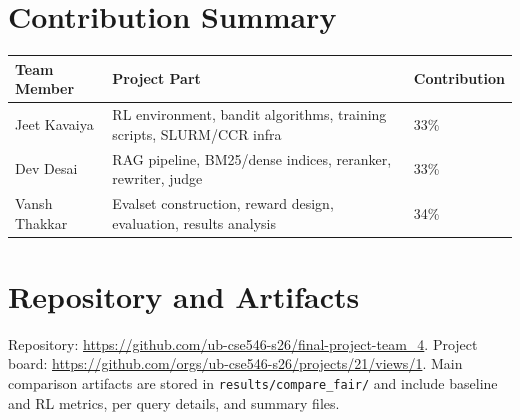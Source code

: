 \documentclass{article}
\begin{document}
\section*{Contribution Summary}

\begin{table}[h]
\centering
\small
\begin{tabular}{lll}
\toprule
Team Member & Project Part & Contribution \\
\midrule
Jeet Kavaiya  & RL environment, bandit algorithms, training scripts, SLURM/CCR infra & 33\% \\
Dev Desai     & RAG pipeline, BM25/dense indices, reranker, rewriter, judge          & 33\% \\
Vansh Thakkar & Evalset construction, reward design, evaluation, results analysis    & 34\% \\
\bottomrule
\end{tabular}
\end{table}

\section*{Repository and Artifacts}

Repository: \url{https://github.com/ub-cse546-s26/final-project-team_4}.  
Project board: \url{https://github.com/orgs/ub-cse546-s26/projects/21/views/1}.  
Main comparison artifacts are stored in \texttt{results/compare\_fair/} and include baseline and RL metrics, per query details, and summary files.


\end{document}
